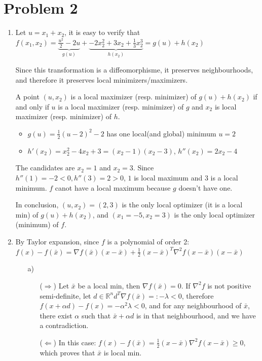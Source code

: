\documentclass[12pt]{article}
\newenvironment{problem}[1]
{\section*{Problem #1}}{}
\begin{document}
\begin{problem}{2}


  \begin{enumerate}
  \item
    Let $u = x_1 + x_2$, it is easy to verify that
    $f(x_1, x_2) = \underbrace{\frac {u^2}2 - 2u}_{g(u)} + \underbrace{- 2 x_2^2 + 3 x_2 + \frac13 x_2^3}_{h(x_2)} = g(u) + h(x_2)$

    Since this transformation is a diffeomorphisme, it preserves neighbourhoods, and therefore it preserves local minimizers/maximizers.

    A point $(u, x_2)$ is a local maximizer (resp. minimizer) of $g(u) + h(x_2)$ if and only if $u$ is a local maximizer (resp. minimizer) of $g$ and $x_2$ is local maximizer (resp. minimizer) of $h$.

    \begin{itemize}
    \item $g(u) = \frac12 (u-2)^2 - 2$ has one local(and global) minimum
      $u = 2$
    \item $h'(x_2) = x_2^2 - 4x_2 + 3 = (x_2 - 1)(x_2 - 3)$,
      $h''(x_2) = 2x_2 - 4$ 
    \end{itemize}
    The candidates are $x_2 = 1$ and $x_2 = 3$. Since $h''(1) = -2 < 0, h''(3) = 2 > 0$, $1$ is local maximum and $3$ is a local minimum.
    $f$ canot have a local maximum because $g$ doesn't have one.
    
    In conclusion, $(u, x_2) = (2, 3)$ is the only local optimizer (it is a local min) of $g(u) + h(x_2)$, and  $(x_1 = -5, x_2 = 3)$ is the only local optimizer (minimum) of $f$.

  \item
    By Taylor expansion, since $f$ is a polynomial of order 2: $f(x) - f(\bar x) = \nabla f(\bar x)(x - \bar x) + \frac12 (x-\bar x)^T \nabla^2 f(x - \bar x) (x-\bar x)$
    \begin{enumerate}
    \item[a)]
      \begin{enumerate}
      \item[($\Rightarrow$)]
        Let $\bar x$ be a local min, then $\nabla f(\bar x) = 0$.
        If $\nabla^2 f$ is not positive semi-definite, let $d \in \mathbb{R}^n d^T\nabla f(\bar x) =: -\lambda < 0$, therefore $f(x + \alpha d) - f(x) = - \alpha^2 \lambda < 0$, and for any neighbourhood of $\bar x$, there exist $\alpha$ such that $\bar x + \alpha d$ is in that neighbourhood, and we have a contradiction.
      \item[($\Leftarrow$)]
        In this case: $f(x) - f(\bar x) = \frac12 (x-\bar x) \nabla^2 f(x - \bar x) \ge 0$, which proves that $\bar x$ is local min.
      \end{enumerate}


\end{enumerate}
\end{enumerate}
\end{problem}
\end{document}
